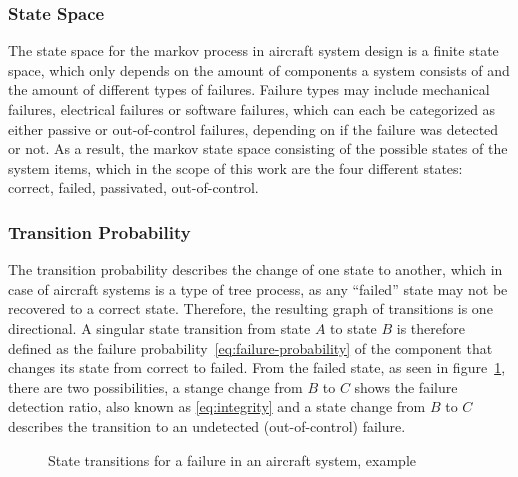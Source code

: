\subsubsection{State Space}\label{subsubsec:state-space}
The state space for the markov process in aircraft system design is a finite state space, which only depends on the amount of components
a system consists of and the amount of different types of failures.
Failure types may include mechanical failures, electrical failures or software failures, which can each be categorized as either
passive or out-of-control failures, depending on if the failure was detected or not.
As a result, the markov state space consisting of the possible states of the system items, which in the scope of
this work are the four different states: correct, failed, passivated, out-of-control.

\subsubsection{Transition Probability}\label{subsubsec:transition-probability}
The transition probability describes the change of one state to another, which in case of aircraft systems is a type of tree
process, as any ``failed'' state may not be recovered to a correct state.
Therefore, the resulting graph of transitions is one directional.
A singular state transition from state $A$ to state $B$ is therefore defined as the failure probability~\ref{eq:failure-probability}
of the component that changes its state
from correct to failed.
From the failed state, as seen in figure~\ref{fig:state-change}, there are two possibilities, a stange change from $B$ to $C$ shows the failure detection ratio, also known as \ref{eq:integrity}
and a state change from $B$ to $C$ describes the transition to an undetected (out-of-control) failure.
\begin{figure}
    \begin{center}
    \end{center}
    \caption{State transitions for a failure in an aircraft system, example}
    \label{fig:state-change}
\end{figure}
